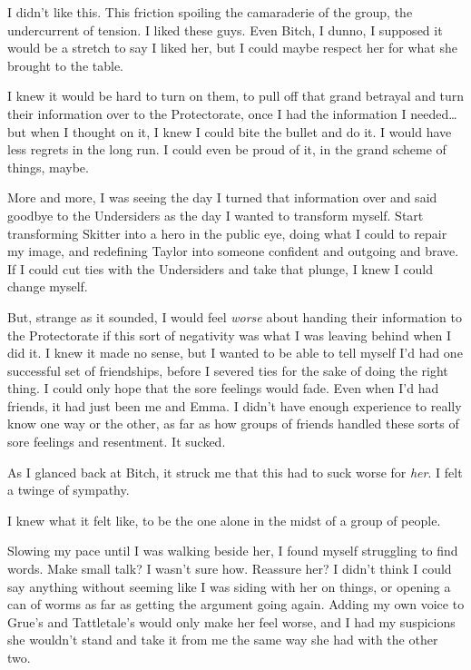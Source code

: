 I didn't like this.  This friction spoiling the camaraderie of the group, the undercurrent of tension.  I liked these guys.  Even Bitch, I dunno, I supposed it would be a stretch to say I liked her, but I could maybe respect her for what she brought to the table.



I knew it would be hard to turn on them, to pull off that grand betrayal and turn their information over to the Protectorate, once I had the information I needed\ldots but when I thought on it, I knew I could bite the bullet and do it.  I would have less regrets in the long run.  I could even be proud of it, in the grand scheme of things, maybe.



More and more, I was seeing the day I turned that information over and said goodbye to the Undersiders as the day I wanted to transform myself.  Start transforming Skitter into a hero in the public eye, doing what I could to repair my image, and redefining Taylor into someone confident and outgoing and brave.  If I could cut ties with the Undersiders and take that plunge, I knew I could change myself.



But, strange as it sounded, I would feel \emph{worse }about handing their information to the Protectorate if this sort of negativity was what I was leaving behind when I did it.  I knew it made no sense, but I wanted to be able to tell myself I'd had one successful set of friendships, before I severed ties for the sake of doing the right thing.  I could only hope that the sore feelings would fade.  Even when I'd had friends, it had just been me and Emma.  I didn't have enough experience to really know one way or the other, as far as how groups of friends handled these sorts of sore feelings and resentment.  It sucked.



As I glanced back at Bitch, it struck me that this had to suck worse for \emph{her}.  I felt a twinge of sympathy.



I knew what it felt like, to be the one alone in the midst of a group of people.



Slowing my pace until I was walking beside her, I found myself struggling to find words.  Make small talk?  I wasn't sure how.  Reassure her?  I didn't think I could say anything without seeming like I was siding with her on things, or opening a can of worms as far as getting the argument going again.  Adding my own voice to Grue's and Tattletale's would only make her feel worse, and I had my suspicions she wouldn't stand and take it from me the same way she had with the other two.



